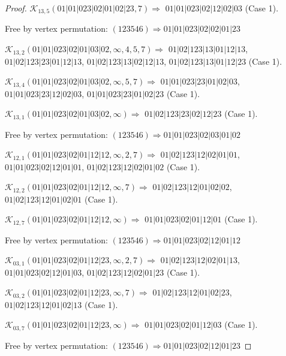 \documentclass[12pt]{article}
\theoremstyle{plain}
\theoremstyle{definition}
\theoremstyle{remark}
\newcommand{\fancy}[1]{\mathcal{#1}}
\def\K{\fancy{K}}
\begin{document}
\begin{proof}
	$\K_{13,5}(01|01|023|02|01|02|23,7)\Rightarrow $ $01|01|023|02|12|02|03$ (Case 1).
	
	
	
	Free by vertex permutation: $(1 2 3 5 4 6)\Rightarrow 01|01|023|02|02|01|23$
	
	
	
	\bigskip
	
	$\K_{13,2}(01|01|023|02|01|03|02,\infty,4, 5, 7)\Rightarrow $ $01|02|123|13|01|12|13$, $01|02|123|23|01|12|13$, $01|02|123|13|02|12|13$, $01|02|123|13|01|12|23$ (Case 1).
	
	$\K_{13,4}(01|01|023|02|01|03|02,\infty,5, 7)\Rightarrow $ $01|01|023|23|01|02|03$, $01|01|023|23|12|02|03$, $01|01|023|23|01|02|23$ (Case 1).
	
	$\K_{13,1}(01|01|023|02|01|03|02,\infty)\Rightarrow $ $01|02|123|23|02|12|23$ (Case 1).
	
	
	
	Free by vertex permutation: $(1 2 3 5 4 6)\Rightarrow 01|01|023|02|03|01|02$
	
	
	
	\bigskip
	
	$\K_{12,1}(01|01|023|02|01|12|12,\infty,2, 7)\Rightarrow $ $01|02|123|12|02|01|01$, $01|01|023|02|12|01|01$, $01|02|123|12|02|01|02$ (Case 1).
	
	$\K_{12,2}(01|01|023|02|01|12|12,\infty,7)\Rightarrow $ $01|02|123|12|01|02|02$, $01|02|123|12|01|02|01$ (Case 1).
	
	$\K_{12,7}(01|01|023|02|01|12|12,\infty)\Rightarrow $ $01|01|023|02|01|12|01$ (Case 1).
	
	
	
	Free by vertex permutation: $(1 2 3 5 4 6)\Rightarrow 01|01|023|02|12|01|12$
	
	
	
	\bigskip
	
	$\K_{03,1}(01|01|023|02|01|12|23,\infty,2, 7)\Rightarrow $ $01|02|123|12|02|01|13$, $01|01|023|02|12|01|03$, $01|02|123|12|02|01|23$ (Case 1).
	
	$\K_{03,2}(01|01|023|02|01|12|23,\infty,7)\Rightarrow $ $01|02|123|12|01|02|23$, $01|02|123|12|01|02|13$ (Case 1).
	
	$\K_{03,7}(01|01|023|02|01|12|23,\infty)\Rightarrow $ $01|01|023|02|01|12|03$ (Case 1).
	
	
	
	Free by vertex permutation: $(1 2 3 5 4 6)\Rightarrow 01|01|023|02|12|01|23$
	
	
	
	\bigskip
	

\end{proof}
\end{document}
